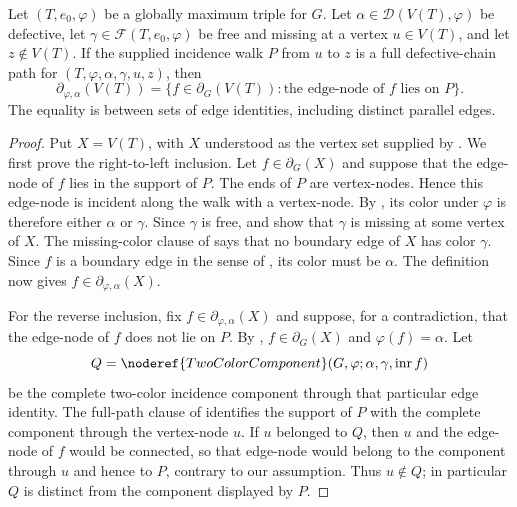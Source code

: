 \begin{lemma}
Let $(T,e_0,\varphi)$ be a globally maximum triple for $G$.  Let
$\alpha\in\mathcal D(V(T),\varphi)$ be defective, let
$\gamma\in\mathcal F(T,e_0,\varphi)$ be free and missing at a vertex
$u\in V(T)$, and let $z\notin V(T)$.  If the supplied incidence walk $P$
from $u$ to $z$ is a full defective-chain path for
$(T,\varphi,\alpha,\gamma,u,z)$, then
\[
 \partial_{\varphi,\alpha}(V(T))
 =\{f\in\partial_G(V(T)): \text{the edge-node of }f\text{ lies on }P\}.
\]
The equality is between sets of edge identities, including distinct
parallel edges.
\end{lemma}
\begin{proof}
Put $X=V(T)$, with $X$ understood as the vertex set supplied by
.  We first prove the right-to-left
inclusion.  Let $f\in\partial_G(X)$ and suppose that the edge-node of $f$
lies in the support of $P$.  The ends of $P$ are vertex-nodes.  Hence this
edge-node is incident along the walk with a vertex-node.  By
, its color under $\varphi$ is therefore
either $\alpha$ or $\gamma$.  Since $\gamma$ is free,
 and  show that
$\gamma$ is missing at some vertex of $X$.  The missing-color clause of
 says that no boundary edge of
$X$ has color $\gamma$.  Since $f$ is a boundary edge in the sense of
, its color must be $\alpha$.  The definition
 now gives
$f\in\partial_{\varphi,\alpha}(X)$.

For the reverse inclusion, fix
$f\in\partial_{\varphi,\alpha}(X)$ and suppose, for a contradiction, that
the edge-node of $f$ does not lie on $P$.  By
, $f\in\partial_G(X)$ and
$\varphi(f)=\alpha$.  Let
\[
 Q=\noderef{TwoColorComponent}(G,\varphi;\alpha,\gamma,
       \operatorname{inr}f)
\]
be the complete two-color incidence component through that particular
edge identity.  The full-path clause of
 identifies the support of $P$ with
the complete component through the vertex-node $u$.  If $u$ belonged to
$Q$, then $u$ and the edge-node of $f$ would be connected, so that edge-node
would belong to the component through $u$ and hence to $P$, contrary to
our assumption.  Thus $u\notin Q$; in particular $Q$ is distinct from the
component displayed by $P$.


\end{proof}
